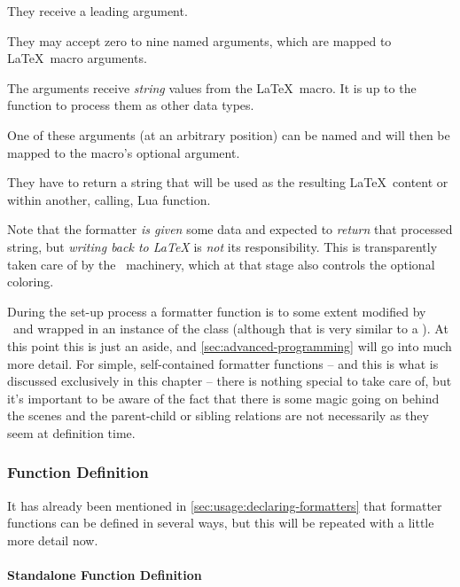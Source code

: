 \documentclass[12pt]{scrartcl}
\begin{document}
\begin{itemize*}
\item They receive a leading  argument.
\item They may accept zero to nine named arguments, which are mapped to \LaTeX\
macro arguments.
\item The arguments receive \emph{string} values from the \LaTeX\ macro.  It is up to the function to process them as other data types.
\item One of these arguments (at an arbitrary position) can be named \luavar{options} and will then be mapped to the macro's optional argument.
\item They have to return a string that will be used as the resulting \LaTeX\
content or within another, calling, Lua function.
\end{itemize*}

\noindent Note that the formatter \emph{is given} some data and expected to
\emph{return} that processed string, but \emph{writing back to \LaTeX} is
\emph{not} its responsibility.  This is transparently taken care of by the
\luatemplates\ machinery, which at that stage also controls the optional
coloring.

During the set-up process a formatter function is to some extent modified by
\luatemplates\ and wrapped in an instance of the 
class (although that is very similar to a \term{Formatter Entry Table}). At this
point this is just an aside, and \vref{sec:advanced-programming} will go into
much more detail.  For simple, self-contained formatter functions  -- and this
is what is discussed exclusively in this chapter -- there is nothing special to
take care of, but it's important to be aware of the fact that there is some
magic going on behind the scenes and the parent-child or sibling relations are
not necessarily as they seem at definition time.


\subsubsection{Function Definition}
\label{sec:defining-function-definition}

It has already been mentioned in \vref{sec:usage:declaring-formatters} that formatter functions can be defined in several ways, but this will be repeated with a little more detail now.


\paragraph{Standalone Function Definition}
\end{document}
